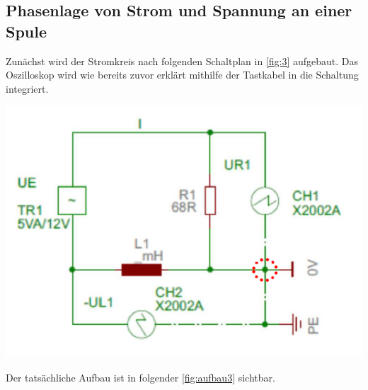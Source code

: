 \documentclass[11pt,ngerman]{scrartcl}
\begin{document}
\subsection{Phasenlage von Strom und Spannung an einer Spule}

Zunächst wird der Stromkreis nach folgenden Schaltplan in \autoref{fig:3} aufgebaut. Das Oszilloskop wird wie bereits zuvor erklärt mithilfe der Tastkabel in die Schaltung integriert.

\begin{center}
	\begin{minipage}[t]{0.5\textwidth}
		\includegraphics[width=\textwidth]{skizze_3}
		\label{fig:3}
	\end{minipage}
\end{center}

\noindent Der tatsächliche Aufbau ist in folgender \autoref{fig:aufbau3} sichtbar.
\end{document}
